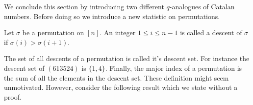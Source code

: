 We conclude this section by introducing two different $q$-analogues of Catalan numbers. Before doing so we introduce a new statistic on permutations. 
\begin{definition}
Let $\sigma$ be a permutation on $[n]$. An integer $1\leq i\leq n-1$ is called a descent of $\sigma$ if $\sigma(i)>\sigma(i+1)$. 
\end{definition}
The set of all descents of a permutation is called it's descent set. For instance the descent set of $(613524)$ is $\{1,4\}$. Finally, the major index of a permutation is the sum of all the elements in the descent set. These definition might seem unmotivated. However, consider the following result which we state without a proof. 

\endinput
